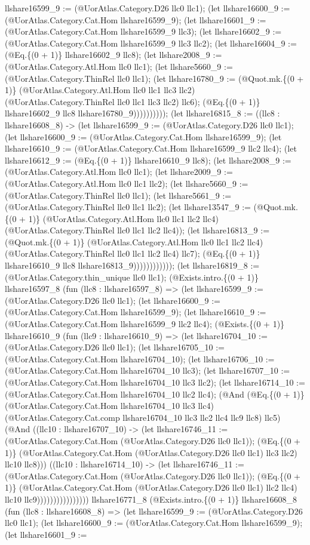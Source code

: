 \documentclass[11pt]{article}
\begin{document}
llshare16599\_9 := (@UorAtlas.Category.D26 llc0 llc1); (let llshare16600\_9 := (@UorAtlas.Category.Cat.Hom llshare16599\_9); (let llshare16601\_9 := (@UorAtlas.Category.Cat.Hom llshare16599\_9 llc3); (let llshare16602\_9 := (@UorAtlas.Category.Cat.Hom llshare16599\_9 llc3 llc2); (let llshare16604\_9 := (@Eq.\{(0 + 1)\} llshare16602\_9 llc8); (let llshare2008\_9 := (@UorAtlas.Category.Atl.Hom llc0 llc1); (let llshare5660\_9 := (@UorAtlas.Category.ThinRel llc0 llc1); (let llshare16780\_9 := (@Quot.mk.\{(0 + 1)\} (@UorAtlas.Category.Atl.Hom llc0 llc1 llc3 llc2) (@UorAtlas.Category.ThinRel llc0 llc1 llc3 llc2) llc6); (@Eq.\{(0 + 1)\} llshare16602\_9 llc8 llshare16780\_9)))))))))); (let llshare16815\_8 := ((llc8 : llshare16608\_8) -> (let llshare16599\_9 := (@UorAtlas.Category.D26 llc0 llc1); (let llshare16600\_9 := (@UorAtlas.Category.Cat.Hom llshare16599\_9); (let llshare16610\_9 := (@UorAtlas.Category.Cat.Hom llshare16599\_9 llc2 llc4); (let llshare16612\_9 := (@Eq.\{(0 + 1)\} llshare16610\_9 llc8); (let llshare2008\_9 := (@UorAtlas.Category.Atl.Hom llc0 llc1); (let llshare2009\_9 := (@UorAtlas.Category.Atl.Hom llc0 llc1 llc2); (let llshare5660\_9 := (@UorAtlas.Category.ThinRel llc0 llc1); (let llshare5661\_9 := (@UorAtlas.Category.ThinRel llc0 llc1 llc2); (let llshare13547\_9 := (@Quot.mk.\{(0 + 1)\} (@UorAtlas.Category.Atl.Hom llc0 llc1 llc2 llc4) (@UorAtlas.Category.ThinRel llc0 llc1 llc2 llc4)); (let llshare16813\_9 := (@Quot.mk.\{(0 + 1)\} (@UorAtlas.Category.Atl.Hom llc0 llc1 llc2 llc4) (@UorAtlas.Category.ThinRel llc0 llc1 llc2 llc4) llc7); (@Eq.\{(0 + 1)\} llshare16610\_9 llc8 llshare16813\_9)))))))))))); (let llshare16819\_8 := (@UorAtlas.Category.thin\_unique llc0 llc1); (@Exists.intro.\{(0 + 1)\} llshare16597\_8 (fun (llc8 : llshare16597\_8) => (let llshare16599\_9 := (@UorAtlas.Category.D26 llc0 llc1); (let llshare16600\_9 := (@UorAtlas.Category.Cat.Hom llshare16599\_9); (let llshare16610\_9 := (@UorAtlas.Category.Cat.Hom llshare16599\_9 llc2 llc4); (@Exists.\{(0 + 1)\} llshare16610\_9 (fun (llc9 : llshare16610\_9) => (let llshare16704\_10 := (@UorAtlas.Category.D26 llc0 llc1); (let llshare16705\_10 := (@UorAtlas.Category.Cat.Hom llshare16704\_10); (let llshare16706\_10 := (@UorAtlas.Category.Cat.Hom llshare16704\_10 llc3); (let llshare16707\_10 := (@UorAtlas.Category.Cat.Hom llshare16704\_10 llc3 llc2); (let llshare16714\_10 := (@UorAtlas.Category.Cat.Hom llshare16704\_10 llc2 llc4); (@And (@Eq.\{(0 + 1)\} (@UorAtlas.Category.Cat.Hom llshare16704\_10 llc3 llc4) (@UorAtlas.Category.Cat.comp llshare16704\_10 llc3 llc2 llc4 llc9 llc8) llc5) (@And ((llc10 : llshare16707\_10) -> (let llshare16746\_11 := (@UorAtlas.Category.Cat.Hom (@UorAtlas.Category.D26 llc0 llc1)); (@Eq.\{(0 + 1)\} (@UorAtlas.Category.Cat.Hom (@UorAtlas.Category.D26 llc0 llc1) llc3 llc2) llc10 llc8))) ((llc10 : llshare16714\_10) -> (let llshare16746\_11 := (@UorAtlas.Category.Cat.Hom (@UorAtlas.Category.D26 llc0 llc1)); (@Eq.\{(0 + 1)\} (@UorAtlas.Category.Cat.Hom (@UorAtlas.Category.D26 llc0 llc1) llc2 llc4) llc10 llc9)))))))))))))))) llshare16771\_8 (@Exists.intro.\{(0 + 1)\} llshare16608\_8 (fun (llc8 : llshare16608\_8) => (let llshare16599\_9 := (@UorAtlas.Category.D26 llc0 llc1); (let llshare16600\_9 := (@UorAtlas.Category.Cat.Hom llshare16599\_9); (let llshare16601\_9 := 
\end{document}
